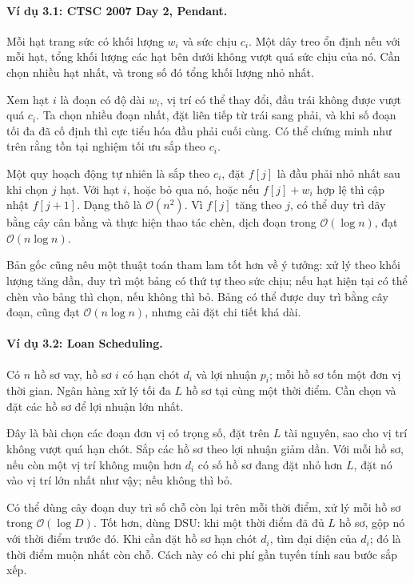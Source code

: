 \documentclass[11pt]{article}
\newcommand{\Oh}{\mathcal{O}}
\begin{document}
\paragraph{Ví dụ 3.1: CTSC 2007 Day 2, Pendant.}
Mỗi hạt trang sức có khối lượng \(w_i\) và sức chịu \(c_i\). Một dây treo ổn
định nếu với mỗi hạt, tổng khối lượng các hạt bên dưới không vượt quá sức chịu
của nó. Cần chọn nhiều hạt nhất, và trong số đó tổng khối lượng nhỏ nhất.

Xem hạt \(i\) là đoạn có độ dài \(w_i\), vị trí có thể thay đổi, đầu trái
không được vượt quá \(c_i\). Ta chọn nhiều đoạn nhất, đặt liên tiếp từ trái
sang phải, và khi số đoạn tối đa đã cố định thì cực tiểu hóa đầu phải cuối
cùng. Có thể chứng minh như trên rằng tồn tại nghiệm tối ưu sắp theo \(c_i\).

Một quy hoạch động tự nhiên là sắp theo \(c_i\), đặt
\(f[j]\) là đầu phải nhỏ nhất sau khi chọn \(j\) hạt. Với hạt \(i\), hoặc bỏ
qua nó, hoặc nếu \(f[j]+w_i\) hợp lệ thì cập nhật \(f[j+1]\). Dạng thô là
\(\Oh(n^2)\). Vì \(f[j]\) tăng theo \(j\), có thể duy trì dãy bằng cây cân
bằng và thực hiện thao tác chèn, dịch đoạn trong \(\Oh(\log n)\), đạt
\(\Oh(n\log n)\).

Bản gốc cũng nêu một thuật toán tham lam tốt hơn về ý tưởng: xử lý theo khối
lượng tăng dần, duy trì một bảng có thứ tự theo sức chịu; nếu hạt hiện tại có
thể chèn vào bảng thì chọn, nếu không thì bỏ. Bảng có thể được duy trì bằng
cây đoạn, cũng đạt \(\Oh(n\log n)\), nhưng cài đặt chi tiết khá dài.

\paragraph{Ví dụ 3.2: Loan Scheduling.}
Có \(n\) hồ sơ vay, hồ sơ \(i\) có hạn chót \(d_i\) và lợi nhuận \(p_i\); mỗi
hồ sơ tốn một đơn vị thời gian. Ngân hàng xử lý tối đa \(L\) hồ sơ tại cùng
một thời điểm. Cần chọn và đặt các hồ sơ để lợi nhuận lớn nhất.

Đây là bài chọn các đoạn đơn vị có trọng số, đặt trên \(L\) tài nguyên, sao
cho vị trí không vượt quá hạn chót. Sắp các hồ sơ theo lợi nhuận giảm dần. Với
mỗi hồ sơ, nếu còn một vị trí không muộn hơn \(d_i\) có số hồ sơ đang đặt nhỏ
hơn \(L\), đặt nó vào vị trí lớn nhất như vậy; nếu không thì bỏ.

Có thể dùng cây đoạn duy trì số chỗ còn lại trên mỗi thời điểm, xử lý mỗi hồ
sơ trong \(\Oh(\log D)\). Tốt hơn, dùng DSU: khi một thời điểm đã đủ \(L\) hồ
sơ, gộp nó với thời điểm trước đó. Khi cần đặt hồ sơ hạn chót \(d_i\), tìm đại
diện của \(d_i\); đó là thời điểm muộn nhất còn chỗ. Cách này có chi phí gần
tuyến tính sau bước sắp xếp.
\end{document}
